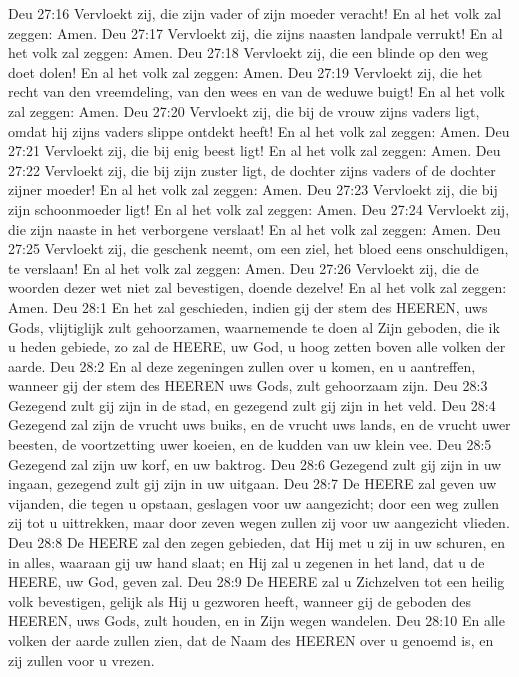 Deu 27:16  Vervloekt zij, die zijn vader of zijn moeder veracht! En al het volk zal zeggen: Amen.
Deu 27:17  Vervloekt zij, die zijns naasten landpale verrukt! En al het volk zal zeggen: Amen.
Deu 27:18  Vervloekt zij, die een blinde op den weg doet dolen! En al het volk zal zeggen: Amen.
Deu 27:19  Vervloekt zij, die het recht van den vreemdeling, van den wees en van de weduwe buigt! En al het volk zal zeggen: Amen.
Deu 27:20  Vervloekt zij, die bij de vrouw zijns vaders ligt, omdat hij zijns vaders slippe ontdekt heeft! En al het volk zal zeggen: Amen.
Deu 27:21  Vervloekt zij, die bij enig beest ligt! En al het volk zal zeggen: Amen.
Deu 27:22  Vervloekt zij, die bij zijn zuster ligt, de dochter zijns vaders of de dochter zijner moeder! En al het volk zal zeggen: Amen.
Deu 27:23  Vervloekt zij, die bij zijn schoonmoeder ligt! En al het volk zal zeggen: Amen.
Deu 27:24  Vervloekt zij, die zijn naaste in het verborgene verslaat! En al het volk zal zeggen: Amen.
Deu 27:25  Vervloekt zij, die geschenk neemt, om een ziel, het bloed eens onschuldigen, te verslaan! En al het volk zal zeggen: Amen.
Deu 27:26  Vervloekt zij, die de woorden dezer wet niet zal bevestigen, doende dezelve! En al het volk zal zeggen: Amen.
Deu 28:1  En het zal geschieden, indien gij der stem des HEEREN, uws Gods, vlijtiglijk zult gehoorzamen, waarnemende te doen al Zijn geboden, die ik u heden gebiede, zo zal de HEERE, uw God, u hoog zetten boven alle volken der aarde.
Deu 28:2  En al deze zegeningen zullen over u komen, en u aantreffen, wanneer gij der stem des HEEREN uws Gods, zult gehoorzaam zijn.
Deu 28:3  Gezegend zult gij zijn in de stad, en gezegend zult gij zijn in het veld.
Deu 28:4  Gezegend zal zijn de vrucht uws buiks, en de vrucht uws lands, en de vrucht uwer beesten, de voortzetting uwer koeien, en de kudden van uw klein vee.
Deu 28:5  Gezegend zal zijn uw korf, en uw baktrog.
Deu 28:6  Gezegend zult gij zijn in uw ingaan, gezegend zult gij zijn in uw uitgaan.
Deu 28:7  De HEERE zal geven uw vijanden, die tegen u opstaan, geslagen voor uw aangezicht; door een weg zullen zij tot u uittrekken, maar door zeven wegen zullen zij voor uw aangezicht vlieden.
Deu 28:8  De HEERE zal den zegen gebieden, dat Hij met u zij in uw schuren, en in alles, waaraan gij uw hand slaat; en Hij zal u zegenen in het land, dat u de HEERE, uw God, geven zal.
Deu 28:9  De HEERE zal u Zichzelven tot een heilig volk bevestigen, gelijk als Hij u gezworen heeft, wanneer gij de geboden des HEEREN, uws Gods, zult houden, en in Zijn wegen wandelen.
Deu 28:10  En alle volken der aarde zullen zien, dat de Naam des HEEREN over u genoemd is, en zij zullen voor u vrezen.
